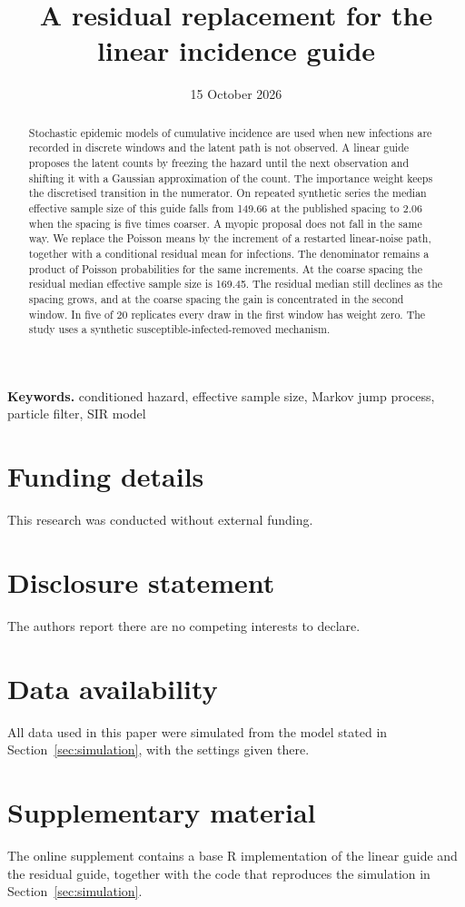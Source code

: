\documentclass[11pt]{article}
\title{A residual replacement for the linear incidence guide}
\author{}
\date{15 October 2026}
\begin{document}
\maketitle

\begin{abstract}
Stochastic epidemic models of cumulative incidence are used when new infections are recorded in discrete windows and the latent path is not observed. A linear guide proposes the latent counts by freezing the hazard until the next observation and shifting it with a Gaussian approximation of the count. The importance weight keeps the discretised transition in the numerator. On repeated synthetic series the median effective sample size of this guide falls from 149.66 at the published spacing to 2.06 when the spacing is five times coarser. A myopic proposal does not fall in the same way. We replace the Poisson means by the increment of a restarted linear-noise path, together with a conditional residual mean for infections. The denominator remains a product of Poisson probabilities for the same increments. At the coarse spacing the residual median effective sample size is 169.45. The residual median still declines as the spacing grows, and at the coarse spacing the gain is concentrated in the second window. In five of 20 replicates every draw in the first window has weight zero. The study uses a synthetic susceptible-infected-removed mechanism.
\end{abstract}

\noindent\textbf{Keywords.} conditioned hazard, effective sample size, Markov jump process, particle filter, SIR model









\section*{Funding details}
This research was conducted without external funding.

\section*{Disclosure statement}
The authors report there are no competing interests to declare.

\section*{Data availability}
All data used in this paper were simulated from the model stated in Section~\ref{sec:simulation}, with the settings given there.

\section*{Supplementary material}
The online supplement contains a base R implementation of the linear guide and the residual guide, together with the code that reproduces the simulation in Section~\ref{sec:simulation}.



\end{document}
